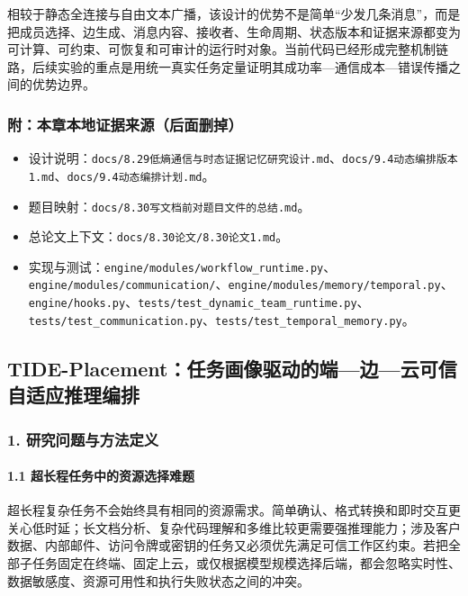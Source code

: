 \documentclass[UTF8,a4paper,12pt]{ctexart}
\providecommand{\tightlist}{%
  \setlength{\itemsep}{0pt}\setlength{\parskip}{0pt}}
\begin{document}
相较于静态全连接与自由文本广播，该设计的优势不是简单``少发几条消息''，而是把成员选择、边生成、消息内容、接收者、生命周期、状态版本和证据来源都变为可计算、可约束、可恢复和可审计的运行时对象。当前代码已经形成完整机制链路，后续实验的重点是用统一真实任务定量证明其成功率—通信成本—错误传播之间的优势边界。

\subsubsection{附：本章本地证据来源（后面删掉）}

\begin{itemize}
\tightlist
\item
  设计说明：\texttt{docs/8.29低熵通信与时态证据记忆研究设计.md}、\texttt{docs/9.4动态编排版本1.md}、\texttt{docs/9.4动态编排计划.md}。
\item
  题目映射：\texttt{docs/8.30写文档前对题目文件的总结.md}。
\item
  总论文上下文：\texttt{docs/8.30论文/8.30论文1.md}。
\item
  实现与测试：\texttt{engine/modules/workflow\_runtime.py}、\texttt{engine/modules/communication/}、\texttt{engine/modules/memory/temporal.py}、\texttt{engine/hooks.py}、\texttt{tests/test\_dynamic\_team\_runtime.py}、\texttt{tests/test\_communication.py}、\texttt{tests/test\_temporal\_memory.py}。
\end{itemize}

\subsection{TIDE-Placement：任务画像驱动的端—边—云可信自适应推理编排}

\subsubsection{1. 研究问题与方法定义}

\paragraph{1.1 超长程任务中的资源选择难题}

超长程复杂任务不会始终具有相同的资源需求。简单确认、格式转换和即时交互更关心低时延；长文档分析、复杂代码理解和多维比较更需要强推理能力；涉及客户数据、内部邮件、访问令牌或密钥的任务又必须优先满足可信工作区约束。若把全部子任务固定在终端、固定上云，或仅根据模型规模选择后端，都会忽略实时性、数据敏感度、资源可用性和执行失败状态之间的冲突。
\end{document}
